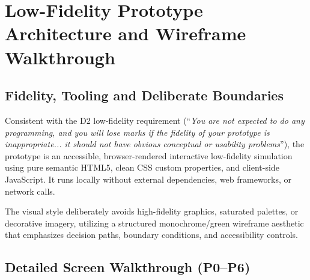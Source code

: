 \documentclass[12pt,a4paper]{article}
\begin{document}
\section{Low-Fidelity Prototype Architecture and Wireframe Walkthrough}

\subsection{Fidelity, Tooling and Deliberate Boundaries}
Consistent with the D2 low-fidelity requirement (``\emph{You are not expected to do any programming, and you will lose marks if the fidelity of your prototype is inappropriate... it should not have obvious conceptual or usability problems}''), the prototype is an accessible, browser-rendered interactive low-fidelity simulation using pure semantic HTML5, clean CSS custom properties, and client-side JavaScript. It runs locally without external dependencies, web frameworks, or network calls.

The visual style deliberately avoids high-fidelity graphics, saturated palettes, or decorative imagery, utilizing a structured monochrome/green wireframe aesthetic that emphasizes decision paths, boundary conditions, and accessibility controls.

\subsection{Detailed Screen Walkthrough (P0--P6)}
\end{document}
